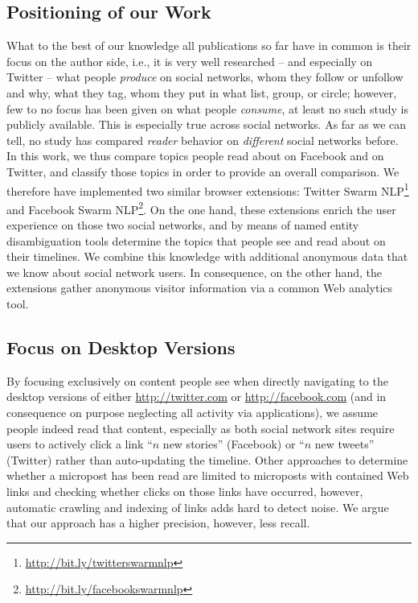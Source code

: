 \documentclass{iosart2c}
\begin{document}
\subsection{Positioning of our Work}
What to the best of our knowledge all publications so far have in common is their focus on the author side, i.e., it is very well researched -- and especially on Twitter -- what people \emph{produce} on social networks, whom they follow or unfollow and why, what they tag, whom they put in what list, group, or circle; however, few to no focus has been given on what people \emph{consume}, at least no such study is publicly available.
This is especially true across social networks.
As far as we can tell, no study has compared \emph{reader} behavior on \emph{different} social networks before.
In this work, we thus compare topics people read about on Facebook and on Twitter, and classify those topics in order to provide an overall comparison. 
We therefore have implemented two similar browser extensions: Twitter Swarm NLP\footnote{\url{http://bit.ly/twitterswarmnlp}} and Facebook Swarm NLP\footnote{\url{http://bit.ly/facebookswarmnlp}}. 
On the one hand, these extensions enrich the user experience on those two social networks, and by means of named entity disambiguation tools determine the topics that people see and read about on their timelines.
We combine this knowledge with additional anonymous data that we know about social network users.
In consequence, on the other hand, the extensions gather anonymous visitor information via a common Web analytics tool.

\subsection{Focus on Desktop Versions}
By focusing exclusively on content people see when directly navigating to the desktop versions of either \url{http://twitter.com} or \url{http://facebook.com} (and in consequence on purpose neglecting all activity via applications), we assume people indeed read that content, especially as both social network sites require users to actively click a link ``$\mathit{n}$ new stories'' (Facebook) or ``$\mathit{n}$ new tweets'' (Twitter) rather than auto-updating the timeline.
Other approaches to determine whether a micropost has been read are limited to microposts with contained Web links and checking whether clicks on those links have occurred, however, automatic crawling and indexing of links adds hard to detect noise.
We argue that our approach has a higher precision, however, less recall.
\end{document}

